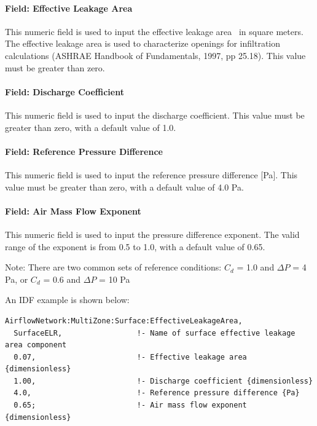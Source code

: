 \paragraph{Field: Effective Leakage Area}\label{field-effective-leakage-area}

This numeric field is used to input the effective leakage area~ in square meters. The effective leakage area is used to characterize openings for infiltration calculations (ASHRAE Handbook of Fundamentals, 1997, pp 25.18). This value must be greater than zero.

\paragraph{Field: Discharge Coefficient}\label{field-discharge-coefficient}

This numeric field is used to input the discharge coefficient. This value must be greater than zero, with a default value of 1.0.

\paragraph{Field: Reference Pressure Difference}\label{field-reference-pressure-difference}

This numeric field is used to input the reference pressure difference {[}Pa{]}. This value must be greater than zero, with a default value of 4.0 Pa.

\paragraph{Field: Air Mass Flow Exponent}\label{field-air-mass-flow-exponent-1}

This numeric field is used to input the pressure difference exponent. The valid range of the exponent is from 0.5 to 1.0, with a default value of 0.65.

\begin{callout}
  Note: There are two common sets of reference conditions: \(C_{d}\) = 1.0 and \(\Delta P\) = 4 Pa, or \(C_d\) = 0.6 and \(\Delta P\) = 10 Pa
\end{callout}

An IDF example is shown below:

\begin{lstlisting}
AirflowNetwork:MultiZone:Surface:EffectiveLeakageArea,
  SurfaceELR,                 !- Name of surface effective leakage area component
  0.07,                       !- Effective leakage area {dimensionless}
  1.00,                       !- Discharge coefficient {dimensionless}
  4.0,                        !- Reference pressure difference {Pa}
  0.65;                       !- Air mass flow exponent {dimensionless}
\end{lstlisting}

